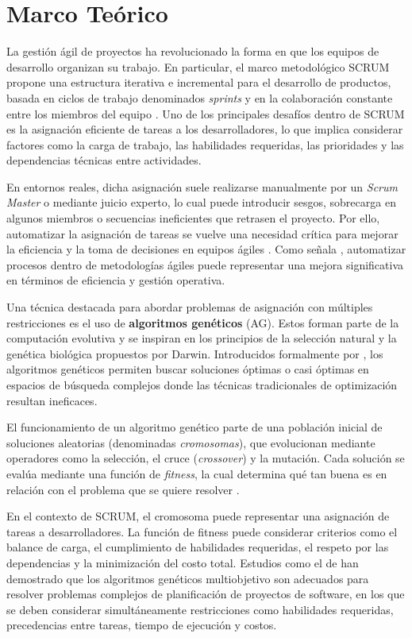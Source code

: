 \section{Marco Teórico}

La gestión ágil de proyectos ha revolucionado la forma en que los equipos de desarrollo organizan su trabajo. En particular, el marco metodológico SCRUM propone una estructura iterativa e incremental para el desarrollo de productos, basada en ciclos de trabajo denominados \textit{sprints} y en la colaboración constante entre los miembros del equipo \parencite{scrumguide2020}. Uno de los principales desafíos dentro de SCRUM es la asignación eficiente de tareas a los desarrolladores, lo que implica considerar factores como la carga de trabajo, las habilidades requeridas, las prioridades y las dependencias técnicas entre actividades.

En entornos reales, dicha asignación suele realizarse manualmente por un \textit{Scrum Master} o mediante juicio experto, lo cual puede introducir sesgos, sobrecarga en algunos miembros o secuencias ineficientes que retrasen el proyecto. Por ello, automatizar la asignación de tareas se vuelve una necesidad crítica para mejorar la eficiencia y la toma de decisiones en equipos ágiles \parencite{masood2017exploring}. Como señala \textcite{maiello2023task}, automatizar procesos dentro de metodologías ágiles puede representar una mejora significativa en términos de eficiencia y gestión operativa.

Una técnica destacada para abordar problemas de asignación con múltiples restricciones es el uso de \textbf{algoritmos genéticos} (AG). Estos forman parte de la computación evolutiva y se inspiran en los principios de la selección natural y la genética biológica propuestos por Darwin. Introducidos formalmente por \textcite{holland1975adaptation}, los algoritmos genéticos permiten buscar soluciones óptimas o casi óptimas en espacios de búsqueda complejos donde las técnicas tradicionales de optimización resultan ineficaces.

El funcionamiento de un algoritmo genético parte de una población inicial de soluciones aleatorias (denominadas \textit{cromosomas}), que evolucionan mediante operadores como la selección, el cruce (\textit{crossover}) y la mutación. Cada solución se evalúa mediante una función de \textit{fitness}, la cual determina qué tan buena es en relación con el problema que se quiere resolver \parencite{goldberg1989genetic}.

En el contexto de SCRUM, el cromosoma puede representar una asignación de tareas a desarrolladores. La función de fitness puede considerar criterios como el balance de carga, el cumplimiento de habilidades requeridas, el respeto por las dependencias y la minimización del costo total. Estudios como el de \textcite{garcia2014spsp} han demostrado que los algoritmos genéticos multiobjetivo son adecuados para resolver problemas complejos de planificación de proyectos de software, en los que se deben considerar simultáneamente restricciones como habilidades requeridas, precedencias entre tareas, tiempo de ejecución y costos.


